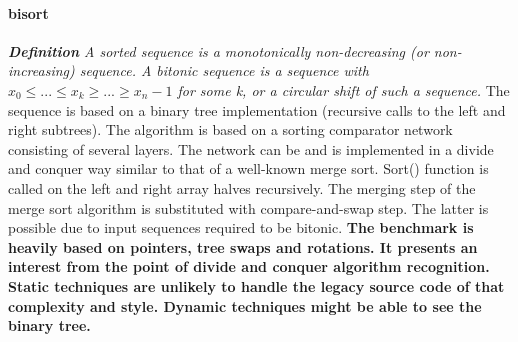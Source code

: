 \paragraph{bisort}
\textit{\textbf{Definition} A sorted sequence is a monotonically non-decreasing (or non-increasing) sequence. A bitonic sequence is a sequence with $x_{0} \leq ... \leq x_{k} \geq ... \geq x_{n} - 1$ for some k, or a circular shift of such a sequence.}\newline\null
\quad The sequence is based on a binary tree implementation (recursive calls to the left and right subtrees). The algorithm is based on a sorting comparator network consisting of several layers. The network can be and is implemented in a divide and conquer way similar to that of a well-known merge sort. Sort() function is called on the left and right array halves recursively. The merging step of the merge sort algorithm is substituted with compare-and-swap step. The latter is possible due to input sequences required to be bitonic.\newline\null
\quad\textbf{The benchmark is heavily based on pointers, tree swaps and rotations. It presents an interest from the point of divide and conquer algorithm recognition. Static techniques are unlikely to handle the legacy source code of that complexity and style. Dynamic techniques might be able to see the binary tree.}
